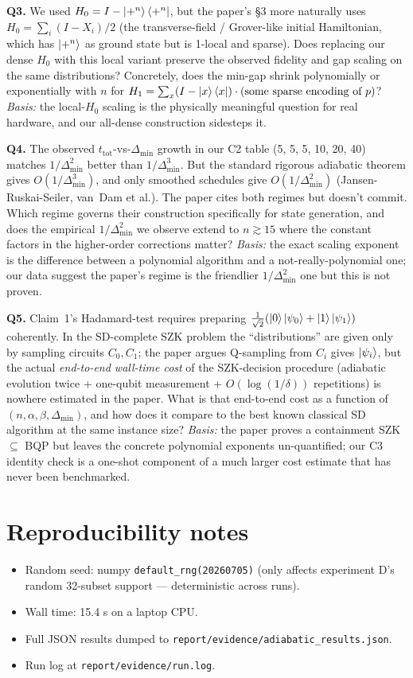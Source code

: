 \documentclass[11pt]{article}
\begin{document}
\textbf{Q3.} We used $H_0 = I - \ket{+^n}\bra{+^n}$, but the paper's \S3 more
naturally uses $H_0 = \sum_i (I - X_i)/2$ (the transverse-field / Grover-like
initial Hamiltonian, which has $\ket{+^n}$ as ground state but is 1-local and
sparse). Does replacing our dense $H_0$ with this local variant preserve the
observed fidelity and gap scaling on the same distributions? Concretely, does
the min-gap shrink polynomially or exponentially with $n$ for
$H_1 = \sum_x (I - \ket{x}\bra{x}) \cdot (\text{some sparse encoding of }p)$?
\emph{Basis:} the local-$H_0$ scaling is the physically meaningful question for
real hardware, and our all-dense construction sidesteps it.

\textbf{Q4.} The observed $t_\text{tot}$-vs-$\Delta_\min$ growth in our C2 table
(5, 5, 5, 10, 20, 40) matches $1/\Delta_\min^2$ better than $1/\Delta_\min^3$.
But the standard rigorous adiabatic theorem gives $O(1/\Delta_\min^3)$, and only
smoothed schedules give $O(1/\Delta_\min^2)$ (Jansen-Ruskai-Seiler, van~Dam et al.).
The paper cites both regimes but doesn't commit. Which regime governs their
construction specifically for state generation, and does the empirical
$1/\Delta_\min^2$ we observe extend to $n \gtrsim 15$ where the constant factors
in the higher-order corrections matter?
\emph{Basis:} the exact scaling exponent is the difference between a polynomial
algorithm and a not-really-polynomial one; our data suggest the paper's regime
is the friendlier $1/\Delta_\min^2$ one but this is not proven.

\textbf{Q5.} Claim~1's Hadamard-test requires preparing
$\frac{1}{\sqrt{2}}(\ket{0}\ket{\psi_0} + \ket{1}\ket{\psi_1})$ coherently. In the
SD-complete SZK problem the ``distributions'' are given only by sampling
circuits $C_0, C_1$; the paper argues Q-sampling from $C_i$ gives $\ket{\psi_i}$,
but the actual \emph{end-to-end wall-time cost} of the SZK-decision procedure
(adiabatic evolution twice + one-qubit measurement + $O(\log(1/\delta))$
repetitions) is nowhere estimated in the paper. What is that end-to-end cost as
a function of $(n, \alpha, \beta, \Delta_\min)$, and how does it compare to the
best known classical SD algorithm at the same instance size?
\emph{Basis:} the paper proves a containment SZK $\subseteq$ BQP but leaves the
concrete polynomial exponents un-quantified; our C3 identity check is a
one-shot component of a much larger cost estimate that has never been benchmarked.

\section{Reproducibility notes}

\begin{itemize}
\item Random seed: numpy \texttt{default\_rng(20260705)} (only affects experiment D's
random 32-subset support --- deterministic across runs).
\item Wall time: 15.4 s on a laptop CPU.
\item Full JSON results dumped to \texttt{report/evidence/adiabatic\_results.json}.
\item Run log at \texttt{report/evidence/run.log}.
\end{itemize}
\end{document}
